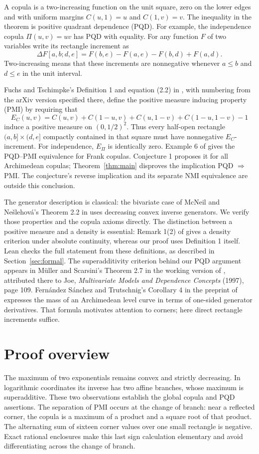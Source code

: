\documentclass[11pt]{article}
\begin{document}
A copula is a two-increasing function on the unit square, zero on the
lower edges and with uniform margins $C(u,1)=u$ and $C(1,v)=v$.
The inequality in the theorem is positive quadrant dependence (PQD).
For example, the independence copula $\Pi(u,v)=uv$ has PQD with equality.
For any function $F$ of two variables write its rectangle increment as
\[
 \Delta F[a,b;d,e]=F(b,e)-F(a,e)-F(b,d)+F(a,d).
\]
Two-increasing means that these increments are nonnegative whenever
$a\leq b$ and $d\leq e$ in the unit interval.

Fuchs and Tschimpke's Definition 1 and equation (2.2) in
\cite{ft}, with numbering from the arXiv version specified there,
define the positive measure inducing property (PMI) by requiring that
\begin{equation}\label{eq:E}
 E_C(u,v)=C(u,v)+C(1-u,v)+C(u,1-v)+C(1-u,1-v)-1
\end{equation}
induce a positive measure on $(0,1/2)^2$. Thus every half-open rectangle
$(a,b]\times(d,e]$ compactly contained in that square must have
nonnegative $E_C$-increment. For independence, $E_\Pi$ is identically zero.
Example 6 of \cite{ft} gives the PQD--PMI equivalence for Frank copulas.
Conjecture 1 proposes it for all Archimedean copulas; Theorem~\ref{thm:main}
disproves the implication PQD $\Rightarrow$ PMI. The conjecture's reverse
implication and its separate NMI equivalence are outside this conclusion.

The generator description is classical: the bivariate case of
McNeil and Ne\v{s}lehov\'a's Theorem 2.2 in \cite{mn} uses decreasing convex
inverse generators. We verify those properties and the copula axioms
directly. The distinction between a positive measure and a density is
essential: Remark 1(2) of \cite{ft} gives a density criterion under absolute
continuity, whereas our proof uses Definition 1 itself. Lean checks the
full statement from these definitions, as described in Section~\ref{sec:formal}.
The superadditivity criterion behind our PQD argument appears in
M\"uller and Scarsini's Theorem 2.7 in the working version of \cite{ms},
attributed there to Joe, \emph{Multivariate Models and Dependence Concepts}
(1997), page 109.
Fern\'andez S\'anchez and Trutschnig's Corollary 4 in the preprint of
\cite{fst} expresses the mass of an Archimedean level curve in terms of
one-sided generator derivatives. That formula motivates attention to
corners; here direct rectangle increments suffice.

\section{Proof overview}
The maximum of two exponentials remains convex and strictly decreasing.
In logarithmic coordinates its inverse has two affine branches, whose
maximum is superadditive. These two observations establish the global
copula and PQD assertions. The separation of PMI occurs at the change of
branch: near a reflected corner, the copula is a maximum of a product
and a square root of that product. The alternating sum of sixteen corner
values over one small rectangle is negative. Exact rational enclosures
make this last sign calculation elementary and avoid differentiating
across the change of branch.
\end{document}
